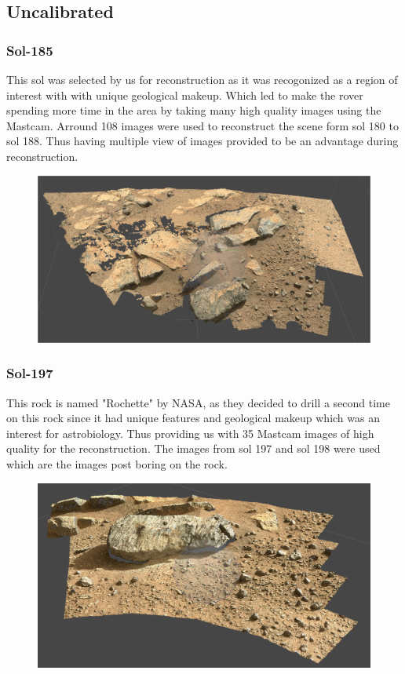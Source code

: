 \subsection{Uncalibrated}

\subsubsection{Sol-185}

This sol was selected by us for reconstruction as it was recogonized as a region of interest with with unique geological makeup. Which led to make the rover spending more time in the area by taking many high quality images using the Mastcam. Arround 108 images were used to reconstruct the scene form sol 180 to sol 188. Thus having multiple view of images provided to be an advantage during reconstruction.

\begin{figure}[H]
	\centering
	\includegraphics[scale=0.3]{img/sol185.png}
	\label{fig:sol185}
	\caption{}
\end{figure}

\subsubsection{Sol-197}

This rock is named "Rochette" by NASA, as they decided to drill a second time on this rock since it had unique features and geological makeup which was an interest for astrobiology. Thus providing us with 35 Mastcam images of high quality for the reconstruction. The images from sol 197 and sol 198 were used which are the images post boring on the rock. 


\begin{figure}[H]
	\centering
	\includegraphics[scale=0.3]{img/sol195.png}
	\label{fig:sol197}
	\caption{}
\end{figure}

